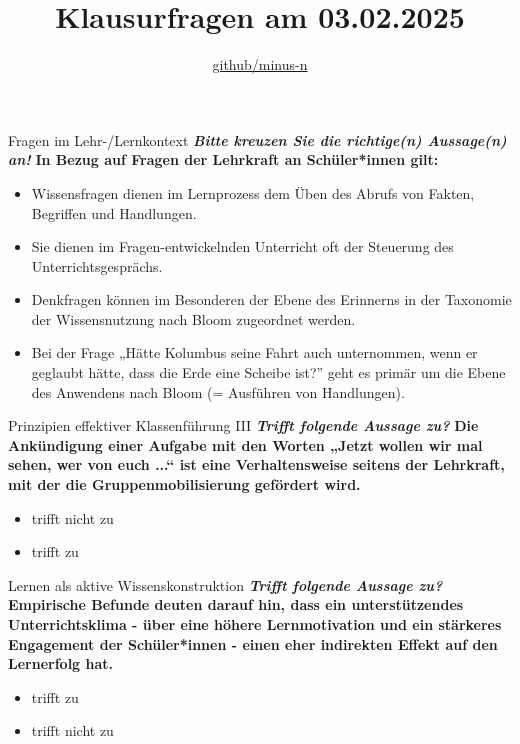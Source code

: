 \documentclass[a4paper]{article}
\title{Klausurfragen am 03.02.2025}
\author{\href{https://github.com/minus-n}{github/minus-n}}
\newcommand{\ACorrectAnswer}{\rlap{$\square$}{\raisebox{2pt}{\large\hspace{1pt}\ding{51}}}\hspace{-2.5pt}}
\newcommand{\AWrongAnswer}{\rlap{$\square$}{\large\hspace{1pt}\ding{55}}}
\newcommand{\AnUnsureAnswer}{\rlap{$\square$}{\large\hspace{1pt}\textbf?}}
\newcommand{\TheCorrectAnswer}{\rlap{\hspace{1.4pt}$\bullet$}{$\ocircle$}}
\newcommand{\TheWrongAnswer}{$\ocircle$}
\newcommand{\defaultCorrect}{\ding{51}}
\newcommand{\defaultWrong}{\ding{55}}
\newcommand{\defaultUnsure}{\textbf{?}}
\newenvironment{answers}{\begin{itemize}}{\end{itemize}}
\newcommand{\correct}{\defaultCorrect}
\newcommand{\wrong}{\defaultWrong}
\newcommand{\unsure}{\defaultUnsure}
\newenvironment{question}[2]{%
    \section[#1 \normalfont(#2)]{#1\\\small\normalfont\hyperlink{tableofcontents}{zurück zum Inhaltsverzeichnis}}%
}{%
    \newpage%
}
\newcommand{\questiontext}[1]{\textbf{#1}}
\newcommand{\assignment}[1]{\textbf{\textit{#1}}\newline}
\newenvironment{multiple-choice}[1]{%
    \begin{question}{#1}{Multiple Choice}%
    \renewenvironment{answers}{%
        \begin{multiple-choice-list}}{\end{multiple-choice-list}%
    }%
    \renewcommand{\correct}{\ACorrectAnswer}%
    \renewcommand{\wrong}{\AWrongAnswer}%
    \renewcommand{\unsure}{\AnUnsureAnswer}%
}%
{%
    \renewcommand{\correct}{\defaultCorrect}%
    \renewcommand{\wrong}{\defaultWrong}%
    \renewcommand{\unsure}{\defaultUnsure}%
    \end{question}%
}
\newenvironment{single-choice}[1]{%
    \begin{question}{#1}{Single Choice}%
    \renewenvironment{answers}{%
        \begin{single-choice-list}}{\end{single-choice-list}%
    }%
    \renewcommand{\correct}{\TheCorrectAnswer}%
    \renewcommand{\wrong}{\TheWrongAnswer}%
    \renewcommand{\unsure}{TheUnsureAnswer}%
}{%
    \renewcommand{\correct}{\defaultCorrect}%
    \renewcommand{\wrong}{\defaultWrong}%
    \renewcommand{\unsure}{\defaultUnsure}%
    \end{question}%
}
\begin{document}

\maketitle
\newpage
\hypertarget{tableofcontents}{}
\tableofcontents
\newpage


\begin{multiple-choice}{Fragen im Lehr-/Lernkontext}
    \assignment{Bitte kreuzen Sie die richtige(n) Aussage(n) an!}
    \questiontext{In Bezug auf Fragen der Lehrkraft an Schüler*innen gilt:}
    \begin{answers}
        \item[\correct] Wissensfragen dienen im Lernprozess dem Üben des Abrufs von Fakten, Begriffen und Handlungen.
        \item[\correct] Sie dienen im Fragen-entwickelnden Unterricht oft der Steuerung des Unterrichtsgesprächs.
        \item[\wrong] Denkfragen können im Besonderen der Ebene des Erinnerns in der Taxonomie der Wissensnutzung nach Bloom zugeordnet werden.
        \item[\wrong] Bei der Frage „Hätte Kolumbus seine Fahrt auch unternommen, wenn er geglaubt hätte, dass die Erde eine Scheibe ist?” geht es primär um die Ebene des Anwendens nach Bloom (= Ausführen von Handlungen).
    \end{answers}
\end{multiple-choice}

\begin{single-choice}{Prinzipien effektiver Klassenführung III}
    \assignment{Trifft folgende Aussage zu?}
    \questiontext{Die Ankündigung einer Aufgabe mit den Worten „Jetzt wollen wir mal sehen, wer von euch ...“ ist eine Verhaltensweise seitens der Lehrkraft, mit der die Gruppenmobilisierung gefördert wird.}
    \begin{answers}
        \item[\correct] trifft nicht zu
        \item[\wrong] trifft zu
    \end{answers}
\end{single-choice}

\begin{single-choice}{Lernen als aktive Wissenskonstruktion}
    \assignment{Trifft folgende Aussage zu?}
    \questiontext{Empirische Befunde deuten darauf hin, dass ein unterstützendes Unterrichtsklima - über eine höhere Lernmotivation und ein stärkeres Engagement der Schüler*innen - einen eher indirekten Effekt auf den Lernerfolg hat.}
    \begin{answers}
        \item[\correct] trifft zu
        \item[\wrong] trifft nicht zu 
    \end{answers}
\end{single-choice}
\end{document}
